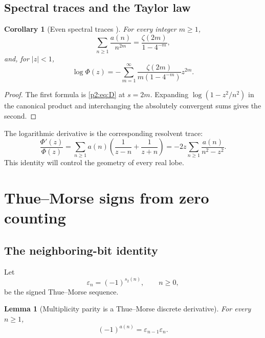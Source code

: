 \documentclass[11pt]{article}
\numberwithin{equation}{section}
\newtheorem{lemma}[theorem]{Lemma}
\newtheorem{corollary}[theorem]{Corollary}
\theoremstyle{definition}
\theoremstyle{remark}
\begin{document}
\subsection{Spectral traces and the Taylor law}

\begin{corollary}[Even spectral traces \NewResult]
\label{p2:cor:traces}
For every integer $m\ge1$,
\begin{equation}
 \sum_{n\ge1}\frac{a(n)}{n^{2m}}
 =\frac{\zeta(2m)}{1-4^{-m}},                              \label{p2:eq:trace}
\end{equation}
and, for $|z|<1$,
\begin{equation}
 \log\Phi(z)
 =-\sum_{m=1}^{\infty}
 \frac{\zeta(2m)}{m(1-4^{-m})}z^{2m}.                    \label{p2:eq:log-taylor}
\end{equation}
\end{corollary}

\begin{proof}
The first formula is \eqref{p2:eq:D} at $s=2m$.  Expanding
$\log(1-z^2/n^2)$ in the canonical product and interchanging the absolutely
convergent sums gives the second.
\end{proof}

The logarithmic derivative is the corresponding resolvent trace:
\begin{equation}
 \frac{\Phi'(z)}{\Phi(z)}
 =\sum_{n\ge1}a(n)\left(\frac1{z-n}+\frac1{z+n}\right)
 =-2z\sum_{n\ge1}\frac{a(n)}{n^2-z^2}.                   \label{p2:eq:logder}
\end{equation}
This identity will control the geometry of every real lobe.

\section{Thue--Morse signs from zero counting}
\label{p2:sec:signs}

\subsection{The neighboring-bit identity}

Let
\begin{equation}
 \varepsilon_n=(-1)^{s_2(n)},\qquad n\ge0,                 \label{p2:eq:eps}
\end{equation}
be the signed Thue--Morse sequence.

\begin{lemma}[Multiplicity parity is a Thue--Morse discrete derivative]
\label{p2:lem:parity}
For every $n\ge1$,
\begin{equation}
 (-1)^{a(n)}=\varepsilon_{n-1}\varepsilon_n.              \label{p2:eq:neighbor}
\end{equation}
\end{lemma}
\end{document}
